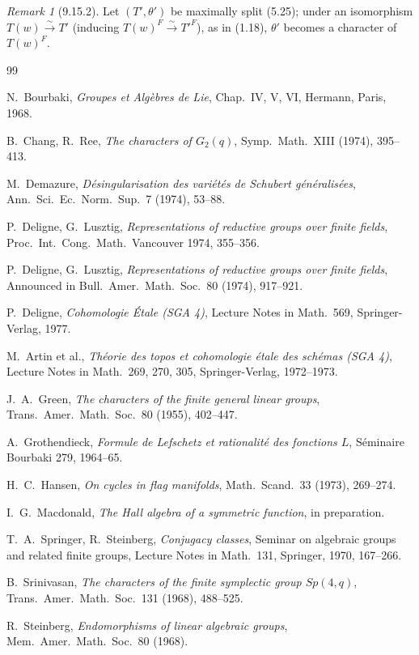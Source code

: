 \documentclass[11pt]{amsart}
\theoremstyle{plain}
\theoremstyle{remark}
\newtheorem{remark}[theorem]{Remark}
\begin{document}
\begin{remark}[9.15.2]
Let $(T', \theta')$ be maximally split (5.25); under an isomorphism $T(w) \xrightarrow{\sim} T'$ (inducing $T(w)^F \xrightarrow{\sim} T'^F$), as in (1.18), $\theta'$ becomes a character of $T(w)^F$.
\end{remark}

\begin{thebibliography}{99}

 N.\ Bourbaki, \textit{Groupes et Alg\`ebres de Lie}, Chap.\ IV, V, VI, Hermann, Paris, 1968.

 B.\ Chang, R.\ Ree, \textit{The characters of $G_2(q)$}, Symp.\ Math.\ XIII (1974), 395--413.

 M.\ Demazure, \textit{D\'esingularisation des vari\'et\'es de Schubert g\'en\'eralis\'ees}, Ann.\ Sci.\ Ec.\ Norm.\ Sup.\ 7 (1974), 53--88.

 P.\ Deligne, G.\ Lusztig, \textit{Representations of reductive groups over finite fields}, Proc.\ Int.\ Cong.\ Math.\ Vancouver 1974, 355--356.

 P.\ Deligne, G.\ Lusztig, \textit{Representations of reductive groups over finite fields}, Announced in Bull.\ Amer.\ Math.\ Soc.\ 80 (1974), 917--921.

 P.\ Deligne, \textit{Cohomologie \'Etale (SGA 4\textonehalf)}, Lecture Notes in Math.\ 569, Springer-Verlag, 1977.

 M.\ Artin et al., \textit{Th\'eorie des topos et cohomologie \'etale des sch\'emas (SGA 4)}, Lecture Notes in Math.\ 269, 270, 305, Springer-Verlag, 1972--1973.

 J.\ A.\ Green, \textit{The characters of the finite general linear groups}, Trans.\ Amer.\ Math.\ Soc.\ 80 (1955), 402--447.

 A.\ Grothendieck, \textit{Formule de Lefschetz et rationalit\'e des fonctions $L$}, S\'eminaire Bourbaki 279, 1964--65.

 H.\ C.\ Hansen, \textit{On cycles in flag manifolds}, Math.\ Scand.\ 33 (1973), 269--274.

 I.\ G.\ Macdonald, \textit{The Hall algebra of a symmetric function}, in preparation.

 T.\ A.\ Springer, R.\ Steinberg, \textit{Conjugacy classes}, Seminar on algebraic groups and related finite groups, Lecture Notes in Math.\ 131, Springer, 1970, 167--266.

 B.\ Srinivasan, \textit{The characters of the finite symplectic group $Sp(4,q)$}, Trans.\ Amer.\ Math.\ Soc.\ 131 (1968), 488--525.

 R.\ Steinberg, \textit{Endomorphisms of linear algebraic groups}, Mem.\ Amer.\ Math.\ Soc.\ 80 (1968).

\end{thebibliography}
\end{document}
